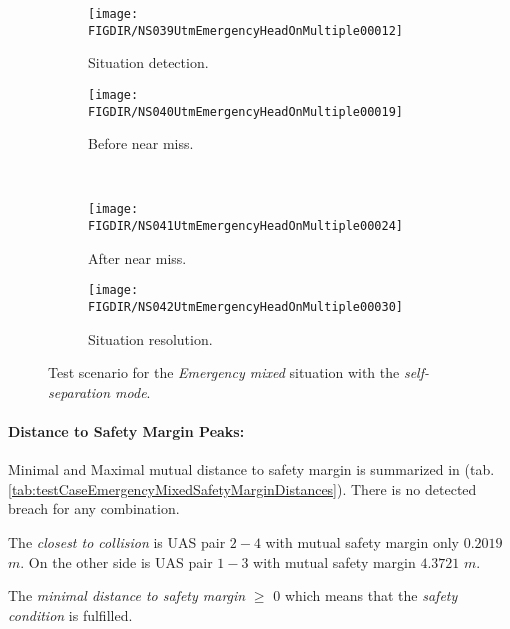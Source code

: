     \begin{figure}[H]
        \centering
        \begin{subfigure}{0.48\textwidth}
        	\centering
            \texttt{[image: \\FIGDIR/NS039UtmEmergencyHeadOnMultiple00012]}
            \caption{Situation detection.}
            \label{fig:emergencyMultipleSituationDetection}
        \end{subfigure}
        \begin{subfigure}{0.48\textwidth}
        	\centering
            \texttt{[image: \\FIGDIR/NS040UtmEmergencyHeadOnMultiple00019]} 
            \caption{Before near miss.}
            \label{fig:emergencyMultipleBeforeNearMiss}
        \end{subfigure}
        \\
        \begin{subfigure}{0.48\textwidth}
        	\centering
            \texttt{[image: \\FIGDIR/NS041UtmEmergencyHeadOnMultiple00024]} 
            \caption{After near miss.}
            \label{fig:emergencyMultipleAfterNearMiss}
        \end{subfigure}
        \begin{subfigure}{0.48\textwidth}
        	\centering
            \texttt{[image: \\FIGDIR/NS042UtmEmergencyHeadOnMultiple00030]} 
            \caption{Situation resolution.}
            \label{fig:emergencyMultipleSituationReslution}
        \end{subfigure}
        \caption{Test scenario for the \emph{Emergency mixed} situation with the \emph{self-separation mode}.}
        \label{fig:testCaseEmergencyMixed}
    \end{figure}
    
    \paragraph{Distance to Safety Margin Peaks:} Minimal and Maximal mutual distance to safety margin is summarized in (tab. \ref{tab:testCaseEmergencyMixedSafetyMarginDistances}). There is no detected breach for any combination. 
    
    The \emph{closest to collision} is UAS pair $2-4$ with mutual safety margin only $0.2019$ $m$. On the other side is UAS pair $1-3$ with mutual safety margin $4.3721$ $m$. 
    
    The \emph{minimal distance to safety margin}  $\ge$ 0 which means that the \emph{safety condition} is fulfilled. 
    
